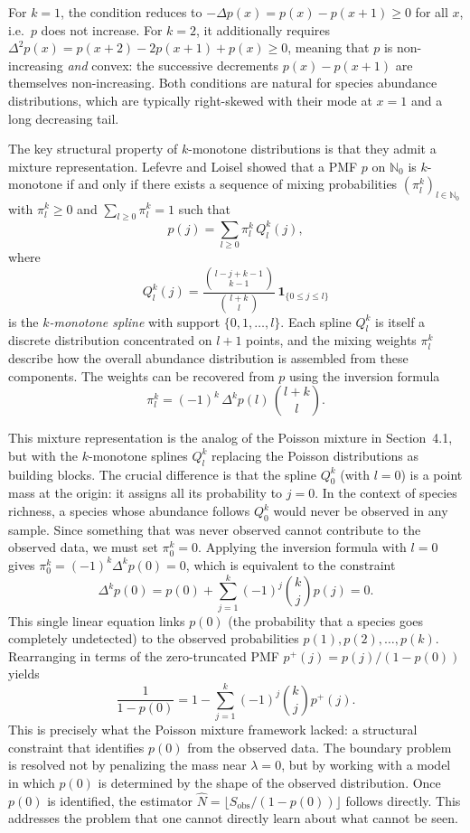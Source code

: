 ﻿\documentclass{article}
\begin{document}
\vspace{1em}

For $k = 1$, the condition reduces to $-\Delta p(x) = p(x) - p(x+1) \geq 0$ for all $x$, i.e.\ $p$ does not increase. For $k = 2$, it additionally requires $\Delta^2 p(x) = p(x+2) - 2p(x+1) + p(x) \geq 0$, meaning that $p$ is non-increasing \emph{and} convex: the successive decrements $p(x) - p(x+1)$ are themselves non-increasing. Both conditions are natural for species abundance distributions, which are typically right-skewed with their mode at $x = 1$ and a long decreasing tail.

\vspace{1em}

The key structural property of $k$-monotone distributions is that they admit a mixture representation. Lefevre and Loisel \cite{LefevreLoisel2013} showed that a PMF $p$ on $\mathbb{N}_0$ is $k$-monotone if and only if there exists a sequence of mixing probabilities $(\pi^k_l)_{l \in \mathbb{N}_0}$ with $\pi^k_l \geq 0$ and $\sum_{l \geq 0} \pi^k_l = 1$ such that
\[
p(j) = \sum_{l \geq 0} \pi^k_l \, Q^k_l(j),
\]
where
\[
Q^k_l(j) = \frac{\binom{l - j + k - 1}{k-1}}{\binom{l+k}{l}} \, \mathbf{1}_{\{0 \leq j \leq l\}}
\]
is the \emph{$k$-monotone spline} with support $\{0, 1, \ldots, l\}$. Each spline $Q^k_l$ is itself a discrete distribution concentrated on $l+1$ points, and the mixing weights $\pi^k_l$ describe how the overall abundance distribution is assembled from these components. The weights can be recovered from $p$ using the inversion formula
\[
\pi^k_l = (-1)^k \, \Delta^k p(l) \, \binom{l+k}{l}.
\]

This mixture representation is the analog of the Poisson mixture in Section~4.1, but with the $k$-monotone splines $Q^k_l$ replacing the Poisson distributions as building blocks. The crucial difference is that the spline $Q^k_0$ (with $l = 0$) is a point mass at the origin: it assigns all its probability to $j = 0$. In the context of species richness, a species whose abundance follows $Q^k_0$ would never be observed in any sample. Since something that was never observed cannot contribute to the observed data, we must set $\pi^k_0 = 0$. Applying the inversion formula with $l = 0$ gives $\pi^k_0 = (-1)^k \Delta^k p(0) = 0$, which is equivalent to the constraint
\[
\Delta^k p(0) = p(0) + \sum_{j=1}^{k} (-1)^j \binom{k}{j} p(j) = 0.
\]
This single linear equation links $p(0)$ (the probability that a species goes completely undetected) to the observed probabilities $p(1), p(2), \ldots, p(k)$. Rearranging in terms of the zero-truncated PMF $p^+(j) = p(j)/(1-p(0))$ yields
\[
\frac{1}{1 - p(0)} = 1 - \sum_{j=1}^{k} (-1)^j \binom{k}{j} p^+(j).
\]
This is precisely what the Poisson mixture framework lacked: a structural constraint that identifies $p(0)$ from the observed data. The boundary problem is resolved not by penalizing the mass near $\lambda = 0$, but by working with a model in which $p(0)$ is determined by the shape of the observed distribution. Once $p(0)$ is identified, the estimator $\hat{N} = \lfloor S_{\mathrm{obs}} / (1 - p(0)) \rfloor$ follows directly. This addresses the problem that one cannot directly learn about what cannot be seen.
\end{document}
